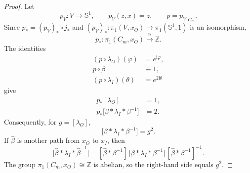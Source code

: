 \documentclass[10pt,a4paper]{amsart}
\begin{document}
\begin{proof}
Let
\[
 p_V:V\longrightarrow\mathbb S^1,
 \qquad p_V(z,x)=z,
 \qquad p=p_V|_{C_m}.
\]
Since $p_*=(p_V)_*\circ j_*$ and
$(p_V)_*:\pi_1(V,x_O)\to\pi_1(\mathbb S^1,1)$ is an isomorphism,
\[
 p_*:\pi_1(C_m,x_O)\xrightarrow{\ \cong\ }\mathbb Z.
\]
The identities
\begin{align*}
 (p\circ\lambda_O)(\varphi)&=e^{\mathrm i\varphi},\\
 p\circ\beta&\equiv1,\\
 (p\circ\lambda_I)(\theta)&=e^{2\mathrm i\theta}
\end{align*}
give
\begin{align*}
 p_*[\lambda_O]&=1,\\
 p_*\bigl[\beta*\lambda_I*\beta^{-1}\bigr]&=2.
\end{align*}
Consequently, for $g=[\lambda_O]$,
\[
 \bigl[\beta*\lambda_I*\beta^{-1}\bigr]=g^2.
\]
If $\widehat\beta$ is another path from $x_O$ to $x_I$, then
\[
 \bigl[\widehat\beta*\lambda_I*\widehat\beta^{-1}\bigr]
 =
 [\widehat\beta*\beta^{-1}]\,
 \bigl[\beta*\lambda_I*\beta^{-1}\bigr]\,
 [\widehat\beta*\beta^{-1}]^{-1}.
\]
The group $\pi_1(C_m,x_O)\cong\mathbb Z$ is abelian, so the right-hand
side equals $g^2$.


\end{proof}
\end{document}
